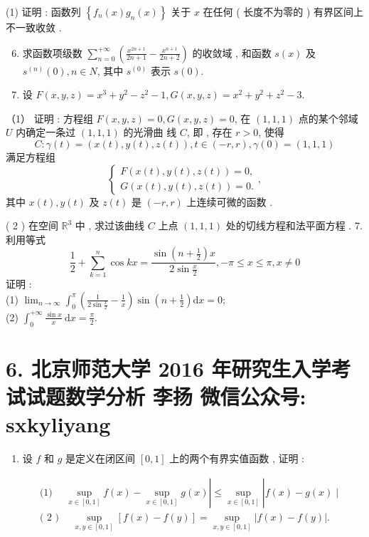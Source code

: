 \documentclass[10pt]{article}
\begin{document}
{(1)  证明 :  函数列  $\left\{f_{n}(x) g_{n}(x)\right\}$  关于  $x$  在任何  ( 长度不为零的 )  有界区间上不一致收敛 .

\begin{enumerate}
  \setcounter{enumi}{5}
  \item  求函数项级数  $\sum_{n=0}^{+\infty}\left(\frac{x^{2 n+1}}{2 n+1}-\frac{x^{n+1}}{2 n+2}\right)$  的收敛域 ,  和函数  $s(x)$  及  $s^{(n)}(0), n \in N$,  其中  $s^{(0)}$  表示  $s(0)$.

  \item  设  $F(x, y, z)=x^{3}+y^{2}-z^{2}-1, G(x, y, z)=x^{2}+y^{2}+z^{2}-3$.

\end{enumerate}
（1） 证明 :  方程组  $F(x, y, z)=0, G(x, y, z)=0$,  在  $(1,1,1)$  点的某个邻域  $U$  内确定一条过  $(1,1,1)$  的光滑曲   线  $C$,  即 ,  存在  $r>0$,  使得 
$$
C: \gamma(t)=(x(t), y(t), z(t)), t \in(-r, r), \gamma(0)=(1,1,1)
$$
 满足方程组 
$$
\left\{\begin{array}{l}
F(x(t), y(t), z(t))=0, \\
G(x(t), y(t), z(t))=0 .
\end{array},\right.
$$
 其中  $x(t), y(t)$  及  $z(t)$  是  $(-r, r)$  上连续可微的函数 .

( 2 )  在空间  $\mathbb{R}^{3}$  中 ,  求过该曲线  $C$  上点  $(1,1,1)$  处的切线方程和法平面方程 . 7.  利用等式 
$$
\frac{1}{2}+\sum_{k=1}^{n} \cos k x=\frac{\sin \left(n+\frac{1}{2}\right) x}{2 \sin \frac{x}{2}},-\pi \leqslant x \leqslant \pi, x \neq 0
$$
 证明 :\\
(1) $\lim _{n \rightarrow \infty} \int_{0}^{\pi}\left(\frac{1}{2 \sin \frac{x}{2}}-\frac{1}{x}\right) \sin \left(n+\frac{1}{2}\right) \mathrm{d} x=0$;\\
(2) $\int_{0}^{+\infty} \frac{\sin x}{x} \mathrm{~d} x=\frac{\pi}{2}$.

\section{6. 北京师范大学 2016 年研究生入学考试试题数学分析 
 李扬 
 微信公众号: sxkyliyang}
\begin{enumerate}
  \item  设  $f$  和  $g$  是定义在闭区间  $[0,1]$  上的两个有界实值函数 ,  证明 :
\end{enumerate}
$$
\begin{aligned}
&\text { (1) } \quad \sup _{x \in[0,1]} f(x)-\sup _{x \in[0,1]} g(x)\left|\leqslant \sup _{x \in[0,1]}\right| f(x)-g(x) \mid \\
&\text { ( 2 ) } \quad \sup _{x, y \in[0,1]}[f(x)-f(y)]=\sup _{x, y \in[0,1]}|f(x)-f(y)| .
\end{aligned}
$$

}
\end{document}
